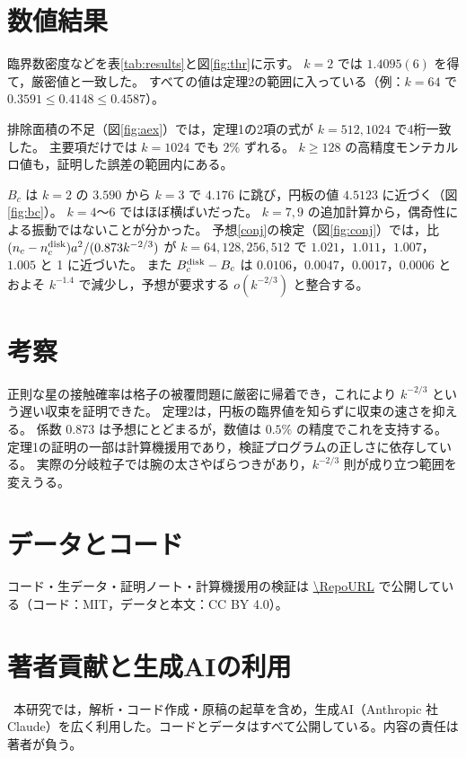 \documentclass[autodetect-engine,ja=standard,a4paper,twocolumn,10pt]{bxjsarticle}
\theoremstyle{plain}
\newcommand{\nd}{n_c^{\rm disk}}
\begin{document}
\section{数値結果}
臨界数密度などを表\ref{tab:results}と図\ref{fig:thr}に示す。
$k=2$ では $1.4095(6)$ を得て，厳密値と一致した。
すべての値は定理2の範囲に入っている（例：$k=64$ で $0.3591\le0.4148\le0.4587$）。



排除面積の不足（図\ref{fig:aex}）では，定理1の2項の式が $k=512, 1024$ で4桁一致した。
主要項だけでは $k=1024$ でも $2\%$ ずれる。
$k\ge128$ の高精度モンテカルロ値も，証明した誤差の範囲内にある。


$B_c$ は $k=2$ の $3.590$ から $k=3$ で $4.176$ に跳び，円板の値 $4.5123$ に近づく（図\ref{fig:bc}）。
$k=4$〜$6$ ではほぼ横ばいだった。
$k=7, 9$ の追加計算から，偶奇性による振動ではないことが分かった。
予想\ref{conj}の検定（図\ref{fig:conj}）では，比 $(n_c-\nd)a^2/(0.873k^{-2/3})$ が $k=64,128,256,512$ で $1.021$，$1.011$，$1.007$，$1.005$ と 1 に近づいた。
また $B_c^{\rm disk}-B_c$ は $0.0106$，$0.0047$，$0.0017$，$0.0006$ とおよそ $k^{-1.4}$ で減少し，予想が要求する $o(k^{-2/3})$ と整合する。


\section{考察}
正則な星の接触確率は格子の被覆問題に厳密に帰着でき，これにより $k^{-2/3}$ という遅い収束を証明できた。
定理2は，円板の臨界値を知らずに収束の速さを抑える。
係数 0.873 は予想にとどまるが，数値は $0.5\%$ の精度でこれを支持する。
定理1の証明の一部は計算機援用であり，検証プログラムの正しさに依存している。
実際の分岐粒子では腕の太さやばらつきがあり，$k^{-2/3}$ 則が成り立つ範囲を変えうる。

\section*{データとコード}
コード・生データ・証明ノート・計算機援用の検証は \url{\RepoURL} で公開している（コード：MIT，データと本文：CC BY 4.0）。

\section*{著者貢献と生成AIの利用}
\ContribJa\
本研究では，解析・コード作成・原稿の起草を含め，生成AI（Anthropic 社 Claude）を広く利用した。コードとデータはすべて公開している。内容の責任は著者が負う。
\end{document}
